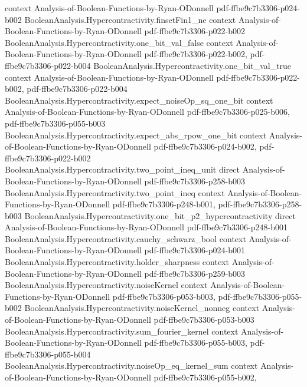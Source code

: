 \begin{theorem}
  {context}
  {Analysis-of-Boolean-Functions-by-Ryan-ODonnell}
  {pdf-ffbe9c7b3306-p024-b002}
\proofstep
  {BooleanAnalysis.Hypercontractivity.finsetFin1_ne}
  {context}
  {Analysis-of-Boolean-Functions-by-Ryan-ODonnell}
  {pdf-ffbe9c7b3306-p022-b002}
\proofstep
  {BooleanAnalysis.Hypercontractivity.one_bit_val_false}
  {context}
  {Analysis-of-Boolean-Functions-by-Ryan-ODonnell}
  {pdf-ffbe9c7b3306-p022-b002,
    pdf-ffbe9c7b3306-p022-b004}
\proofstep
  {BooleanAnalysis.Hypercontractivity.one_bit_val_true}
  {context}
  {Analysis-of-Boolean-Functions-by-Ryan-ODonnell}
  {pdf-ffbe9c7b3306-p022-b002,
    pdf-ffbe9c7b3306-p022-b004}
\proofstep
  {BooleanAnalysis.Hypercontractivity.expect_noiseOp_sq_one_bit}
  {context}
  {Analysis-of-Boolean-Functions-by-Ryan-ODonnell}
  {pdf-ffbe9c7b3306-p025-b006,
    pdf-ffbe9c7b3306-p055-b003}
\proofstep
  {BooleanAnalysis.Hypercontractivity.expect_abs_rpow_one_bit}
  {context}
  {Analysis-of-Boolean-Functions-by-Ryan-ODonnell}
  {pdf-ffbe9c7b3306-p024-b002,
    pdf-ffbe9c7b3306-p022-b002}
\proofstep
  {BooleanAnalysis.Hypercontractivity.two_point_ineq_unit}
  {direct}
  {Analysis-of-Boolean-Functions-by-Ryan-ODonnell}
  {pdf-ffbe9c7b3306-p258-b003}
\proofstep
  {BooleanAnalysis.Hypercontractivity.two_point_ineq}
  {context}
  {Analysis-of-Boolean-Functions-by-Ryan-ODonnell}
  {pdf-ffbe9c7b3306-p248-b001,
    pdf-ffbe9c7b3306-p258-b003}
\proofstep
  {BooleanAnalysis.Hypercontractivity.one_bit_p2_hypercontractivity}
  {direct}
  {Analysis-of-Boolean-Functions-by-Ryan-ODonnell}
  {pdf-ffbe9c7b3306-p248-b001}
\proofstep
  {BooleanAnalysis.Hypercontractivity.cauchy_schwarz_bool}
  {context}
  {Analysis-of-Boolean-Functions-by-Ryan-ODonnell}
  {pdf-ffbe9c7b3306-p024-b001}
\proofstep
  {BooleanAnalysis.Hypercontractivity.holder_sharpness}
  {context}
  {Analysis-of-Boolean-Functions-by-Ryan-ODonnell}
  {pdf-ffbe9c7b3306-p259-b003}
\proofstep
  {BooleanAnalysis.Hypercontractivity.noiseKernel}
  {context}
  {Analysis-of-Boolean-Functions-by-Ryan-ODonnell}
  {pdf-ffbe9c7b3306-p053-b003,
    pdf-ffbe9c7b3306-p055-b002}
\proofstep
  {BooleanAnalysis.Hypercontractivity.noiseKernel_nonneg}
  {context}
  {Analysis-of-Boolean-Functions-by-Ryan-ODonnell}
  {pdf-ffbe9c7b3306-p053-b003}
\proofstep
  {BooleanAnalysis.Hypercontractivity.sum_fourier_kernel}
  {context}
  {Analysis-of-Boolean-Functions-by-Ryan-ODonnell}
  {pdf-ffbe9c7b3306-p055-b003,
    pdf-ffbe9c7b3306-p055-b004}
\proofstep
  {BooleanAnalysis.Hypercontractivity.noiseOp_eq_kernel_sum}
  {context}
  {Analysis-of-Boolean-Functions-by-Ryan-ODonnell}
  {pdf-ffbe9c7b3306-p055-b002,
}
\end{theorem}

